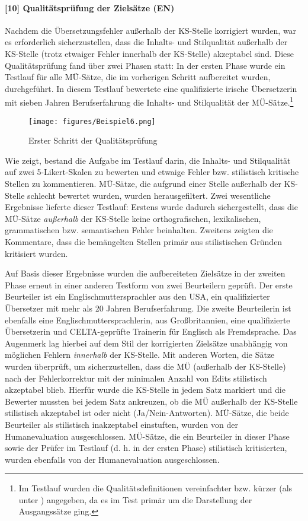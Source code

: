 \paragraph*{[10] Qualitätsprüfung der Zielsätze (EN)}

Nachdem die Übersetzungsfehler außerhalb der KS-Stelle korrigiert wurden, war es erforderlich sicherzustellen, dass die Inhalts- und Stilqualität außerhalb der KS-Stelle (trotz etwaiger Fehler innerhalb der KS-Stelle) akzeptabel sind. Diese Qualitätsprüfung fand über zwei Phasen statt: In der ersten Phase wurde ein Testlauf für alle MÜ-Sätze, die im vorherigen Schritt aufbereitet wurden, durchgeführt. In diesem Testlauf bewertete eine qualifizierte irische Übersetzerin mit sieben Jahren Berufserfahrung die Inhalts- und Stilqualität der MÜ-Sätze.\footnote{{Im Testlauf wurden die Qualitätsdefinitionen vereinfachter bzw. kürzer (als unter ) angegeben, da es im Test primär um die Darstellung der Ausgangssätze ging.}}


\begin{figure}
\texttt{[image: figures/Beispiel6.png]}
\caption{\label{figex:4:6}Erster Schritt der Qualitätsprüfung}
\end{figure}

\newpage
Wie  zeigt, bestand die Aufgabe im Testlauf darin, die Inhalts- und Stilqualität auf zwei 5-Likert-Skalen zu bewerten und etwaige Fehler bzw. stilistisch kritische Stellen zu kommentieren. MÜ-Sätze, die aufgrund einer Stelle außerhalb der KS-Stelle schlecht bewertet wurden, wurden herausgefiltert. Zwei wesentliche Ergebnisse lieferte dieser Testlauf: Erstens wurde dadurch sichergestellt, dass die MÜ-Sätze \textit{außerhalb} der KS-Stelle keine orthografischen, lexikalischen, grammatischen bzw. semantischen Fehler beinhalten. Zweitens zeigten die Kommentare, dass die bemängelten Stellen primär aus stilistischen Gründen kritisiert wurden.

Auf Basis dieser Ergebnisse wurden die aufbereiteten Zielsätze in der zweiten Phase erneut in einer anderen Testform von zwei Beurteilern geprüft. Der erste Beurteiler ist ein Englischmuttersprachler aus den USA, ein qualifizierter Übersetzer mit mehr als 20 Jahren Berufserfahrung. Die zweite Beurteilerin ist ebenfalls eine Englischmuttersprachlerin, aus Großbritannien, eine qualifizierte Übersetzerin und CELTA-geprüfte Trainerin für Englisch als Fremdsprache. Das Augenmerk lag hierbei auf dem Stil der korrigierten Zielsätze unabhängig von möglichen Fehlern \textit{innerhalb} der KS-Stelle. Mit anderen Worten, die Sätze wurden überprüft, um sicherzustellen, dass die MÜ (außerhalb der KS-Stelle) nach der Fehlerkorrektur mit der minimalen Anzahl von Edits stilistisch akzeptabel blieb. Hierfür wurde die KS-Stelle in jedem Satz markiert und die Bewerter mussten bei jedem Satz ankreuzen, ob die MÜ außerhalb der KS-Stelle stilistisch akzeptabel ist oder nicht (Ja/Nein-Antworten). MÜ-Sätze, die beide Beurteiler als stilistisch inakzeptabel einstuften, wurden von der Humanevaluation ausgeschlossen. MÜ-Sätze, die ein Beurteiler in dieser Phase sowie der Prüfer im Testlauf (d. h. in der ersten Phase) stilistisch kritisierten, wurden ebenfalls von der Humanevaluation ausgeschlossen.


